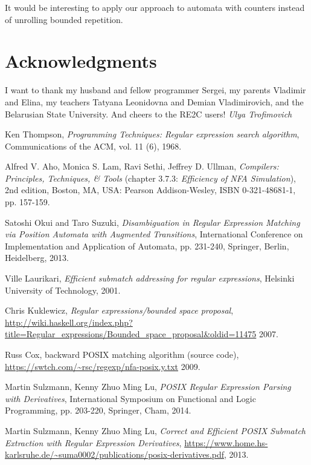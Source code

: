 \documentclass[AMA,STIX1COL]{WileyNJD-v2}
\begin{document}
It would be interesting to apply our approach to automata with counters
instead of unrolling bounded repetition.


\section*{Acknowledgments}

I want to thank my husband and fellow programmer Sergei,
my parents Vladimir and Elina, my teachers Tatyana Leonidovna and Demian Vladimirovich, and the Belarusian State University.
And cheers to the RE2C users!
\null\hfill\textit{Ulya Trofimovich}


\begin{thebibliography}{99}

    Ken Thompson,
    \textit{Programming Techniques: Regular expression search algorithm},
    Communications of the ACM,
    vol. 11 (6),
    1968.

    Alfred V. Aho, Monica S. Lam, Ravi Sethi, Jeffrey D. Ullman,
    \textit{Compilers: Principles, Techniques, \& Tools} (chapter 3.7.3: \textit{Efficiency of NFA Simulation}),
    2nd edition,
    Boston, MA, USA: Pearson Addison-Wesley,
    ISBN 0-321-48681-1,
    pp. 157-159.

    Satoshi Okui and Taro Suzuki,
    \textit{Disambiguation in Regular Expression Matching via Position Automata with Augmented Transitions},
    International Conference on Implementation and Application of Automata, pp. 231-240, Springer, Berlin, Heidelberg,
    2013.

    Ville Laurikari,
    \textit{Efficient submatch addressing for regular expressions},
    Helsinki University of Technology,
    2001.

    Chris Kuklewicz,
    \textit{Regular expressions/bounded space proposal},
    \url{http://wiki.haskell.org/index.php?title=Regular_expressions/Bounded_space_proposal&oldid=11475}
    2007.

    Russ Cox,
    backward POSIX matching algorithm (source code),
    \url{https://swtch.com/~rsc/regexp/nfa-posix.y.txt}
    2009.

    Martin Sulzmann, Kenny Zhuo Ming Lu,
    \textit{POSIX Regular Expression Parsing with Derivatives},
    International Symposium on Functional and Logic Programming, pp. 203-220, Springer, Cham,
    2014.

    Martin Sulzmann, Kenny Zhuo Ming Lu,
    \textit{Correct and Efficient POSIX Submatch Extraction with Regular Expression Derivatives},
    \url{https://www.home.hs-karlsruhe.de/~suma0002/publications/posix-derivatives.pdf},
    2013.


\end{thebibliography}
\end{document}
